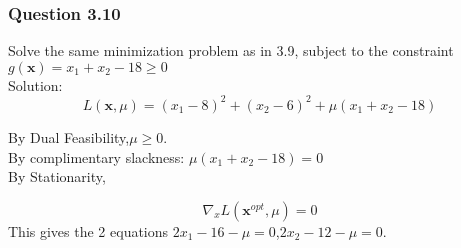 \documentclass{beamer}
\begin{document}

\begin{frame}
\frametitle{Question 3.10}
Solve the same minimization problem as in 3.9,
subject to the constraint $ g( \textbf{x} )=x_1+x_2-18 \geq 0 $\\
Solution:\\
\begin{equation*}
   L(\textbf{x},\mu)=(x_1-8)^2+(x_2-6)^2 + \mu(x_1+x_2-18) 
\end{equation*}

By Dual Feasibility,$\mu \geq 0$.\\
By complimentary slackness: $\mu(x_1+x_2-18)=0$\\
By Stationarity,

\begin{equation*}
   \nabla_{x} L( \textbf{x}^{opt} , \mu )=0
\end{equation*}
This gives the 2 equations $2x_1 - 16 - \mu =0$,$2x_2 - 12 - \mu=0$.
\end{frame}
\end{document}
